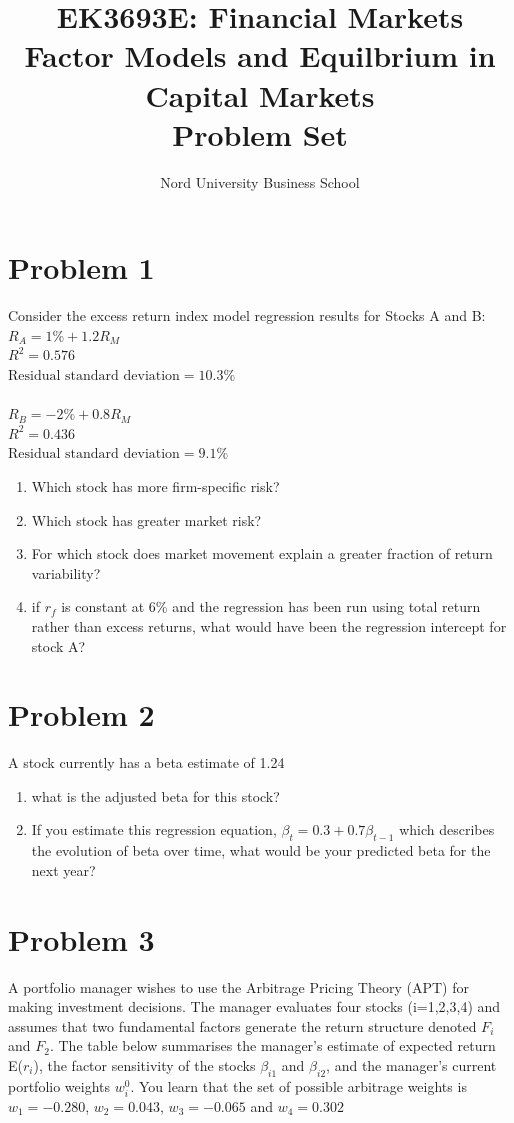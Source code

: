 \documentclass[12]{article}
\title{EK3693E: Financial Markets\\ Factor Models and Equilbrium in Capital Markets\\ Problem Set}
\author{Nord University Business School}
\date{}
\begin{document}
\maketitle

\color{black}
\section*{Problem 1}
Consider the excess return index model regression results for Stocks A and B:\\
$R_A = 1\% + 1.2R_M$\\
$R^2 = 0.576$\\
$ \text{Residual standard deviation} = 10.3\%$\\
\\
$R_B = -2\% + 0.8R_M$\\
$R^2 = 0.436$\\
$\text{Residual standard deviation} = 9.1\%$\\
\begin{enumerate}
    \item[a)] Which stock has more firm-specific risk?
    \item[b)] Which stock has greater market risk?
    \item[c)] For which stock does market movement explain a greater fraction of return variability?
    \item[d] if $r_f$ is constant at 6\% and the regression has been run using total return rather than excess returns, what would have been the regression intercept for stock A?
\end{enumerate}




\color{black}
\section*{Problem 2}
A stock currently has a beta estimate of 1.24
\begin{enumerate}
    \item[a)] what is the adjusted beta for this stock?
    \item[b)] If you estimate this regression equation, $\beta_t = 0.3 + 0.7\beta_{t-1}$ which describes the evolution of beta over time, what would be your predicted beta for the next year?
\end{enumerate}




\color{black}
\section*{Problem 3}
A portfolio manager wishes to use the Arbitrage Pricing Theory (APT) for making investment decisions. The manager evaluates four stocks (i=1,2,3,4) and assumes that two fundamental factors generate the return structure denoted $F_i$ and $F_2$. The table below summarises the manager's estimate of expected return E($r_i$), the factor sensitivity of the stocks $\beta_{i1}$ and $\beta_{i2}$, and the manager's current portfolio weights $w_i^0$.
You learn that the set of possible arbitrage weights is $w_1 = -0.280$, $w_2 = 0.043$, $w_3 = -0.065$ and $w_4 = 0.302$
\end{document}

